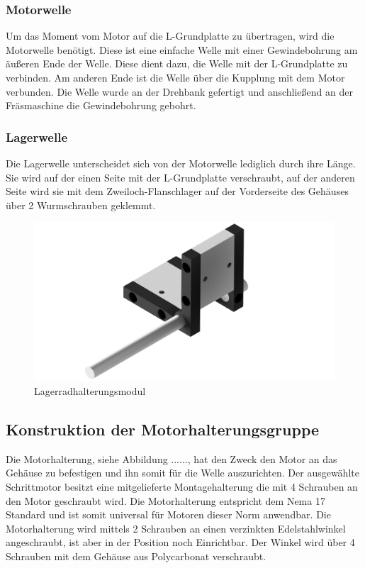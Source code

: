 \subsubsection{Motorwelle}
Um das Moment vom Motor auf die L-Grundplatte zu übertragen, wird die Motorwelle benötigt. Diese ist eine einfache Welle
mit einer Gewindebohrung am äußeren Ende der Welle. Diese dient dazu, die Welle mit der L-Grundplatte zu verbinden.
Am anderen Ende ist die Welle über die Kupplung mit dem Motor verbunden.
Die Welle wurde an der Drehbank gefertigt und anschließend an der Fräsmaschine die Gewindebohrung gebohrt.

\subsubsection{Lagerwelle}
Die Lagerwelle unterscheidet sich von der Motorwelle lediglich durch ihre Länge. Sie wird auf der einen Seite mit der
L-Grundplatte verschraubt, auf der anderen Seite wird sie mit dem Zweiloch-Flanschlager auf der Vorderseite des Gehäuses über
2 Wurmschrauben geklemmt.

\begin{figure}[H]
    \centering
    \includegraphics[scale=0.25,page=1]{fig/mech/LagerRadGruppekomplett}
    \caption{Lagerradhalterungsmodul}
\end{figure}

\subsection{Konstruktion der Motorhalterungsgruppe}

Die Motorhalterung, siehe Abbildung ......, hat den Zweck den Motor an das Gehäuse zu befestigen und ihn somit für die Welle auszurichten. Der ausgewählte Schrittmotor
besitzt eine mitgelieferte Montagehalterung die mit 4 Schrauben an den Motor geschraubt wird. Die Motorhalterung entspricht dem Nema 17
Standard und ist somit universal für Motoren dieser Norm anwendbar. Die Motorhalterung wird mittels 2 Schrauben an einen verzinkten Edelstahlwinkel angeschraubt, ist aber
in der Position noch Einrichtbar. Der Winkel wird über 4 Schrauben mit dem Gehäuse aus Polycarbonat verschraubt.

